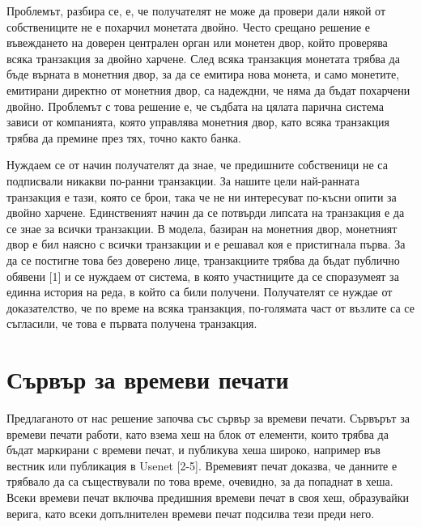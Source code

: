 \documentclass[11pt,a4paper]{article}
\begin{document}
Проблемът, разбира се, е, че получателят не може да провери дали някой от собствениците не е похарчил монетата двойно. Често срещано решение е въвеждането на доверен централен орган или монетен двор, който проверява всяка транзакция за двойно харчене. След всяка транзакция монетата трябва да бъде върната в монетния двор, за да се емитира нова монета, и само монетите, емитирани директно от монетния двор, са надеждни, че няма да бъдат похарчени двойно. Проблемът с това решение е, че съдбата на цялата парична система зависи от компанията, която управлява монетния двор, като всяка транзакция трябва да премине през тях, точно както банка.

Нуждаем се от начин получателят да знае, че предишните собственици не са подписвали никакви по-ранни транзакции. За нашите цели най-ранната транзакция е тази, която се брои, така че не ни интересуват по-късни опити за двойно харчене. Единственият начин да се потвърди липсата на транзакция е да се знае за всички транзакции. В модела, базиран на монетния двор, монетният двор е бил наясно с всички транзакции и е решавал коя е пристигнала първа. За да се постигне това без доверено лице, транзакциите трябва да бъдат публично обявени [1] и се нуждаем от система, в която участниците да се споразумеят за единна история на реда, в който са били получени. Получателят се нуждае от доказателство, че по време на всяка транзакция, по-голямата част от възлите са се съгласили, че това е първата получена транзакция.

\section{Сървър за времеви печати}
Предлаганото от нас решение започва със сървър за времеви печати. Сървърът за времеви печати работи, като взема хеш на блок от елементи, които трябва да бъдат маркирани с времеви печат, и публикува хеша широко, например във вестник или публикация в Usenet [2-5]. Времевият печат доказва, че данните е трябвало да са съществували по това време, очевидно, за да попаднат в хеша. Всеки времеви печат включва предишния времеви печат в своя хеш, образувайки верига, като всеки допълнителен времеви печат подсилва тези преди него.
\end{document}
